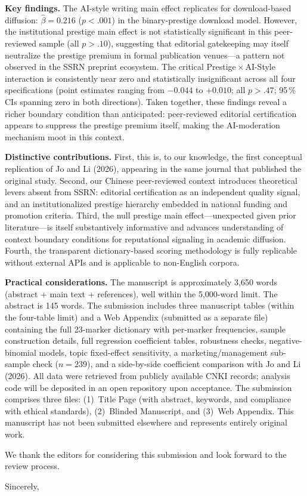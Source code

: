 \documentclass[12pt,a4paper]{article}
\begin{document}
\medskip
\noindent\textbf{Key findings.}
The AI-style writing main effect replicates for download-based diffusion:
$\hat\beta = 0.216$ ($p < .001$) in the binary-prestige download model.
However, the institutional prestige main effect is not statistically
significant in this peer-reviewed sample (all $p > .10$), suggesting that
editorial gatekeeping may itself neutralize the prestige premium in formal
publication venues---a pattern not observed in the SSRN preprint ecosystem.
The critical Prestige\,$\times$\,AI-Style interaction is consistently
near zero and statistically insignificant across all four specifications
(point estimates ranging from $-0.044$ to $+0.010$;
all $p > .47$; 95\,\% CIs spanning zero in both directions).
Taken together, these findings reveal a richer boundary condition than
anticipated: peer-reviewed editorial certification appears to suppress
the prestige premium itself, making the AI-moderation mechanism moot in
this context.

\medskip
\noindent\textbf{Distinctive contributions.}
First, this is, to our knowledge, the first conceptual replication of Jo
and Li (2026), appearing in the same journal that published the original
study.
Second, our Chinese peer-reviewed context introduces theoretical levers
absent from SSRN: editorial certification as an independent quality signal,
and an institutionalized prestige hierarchy embedded in national funding
and promotion criteria.
Third, the null prestige main effect---unexpected given prior literature---is
itself substantively informative and advances understanding of context
boundary conditions for reputational signaling in academic diffusion.
Fourth, the transparent dictionary-based scoring methodology is fully
replicable without external APIs and is applicable to non-English corpora.

\medskip
\noindent\textbf{Practical considerations.}
The manuscript is approximately 3,650 words (abstract + main text +
references), well within the 5,000-word limit.
The abstract is 145 words.
The submission includes three manuscript tables (within the four-table
limit) and a Web Appendix (submitted as a separate file) containing
the full 23-marker dictionary with per-marker frequencies, sample
construction details, full regression coefficient tables, robustness
checks, negative-binomial models, topic fixed-effect sensitivity, a
marketing/management sub-sample check ($n = 239$), and a side-by-side
coefficient comparison with Jo and Li (2026).
All data were retrieved from publicly available CNKI records; analysis
code will be deposited in an open repository upon acceptance.
The submission comprises three files: (1)~Title Page (with abstract,
keywords, and compliance with ethical standards), (2)~Blinded
Manuscript, and (3)~Web Appendix.
This manuscript has not been submitted elsewhere and represents
entirely original work.

\bigskip

We thank the editors for considering this submission and look forward to
the review process.

\bigskip

\noindent Sincerely,

\bigskip\bigskip

\end{document}

